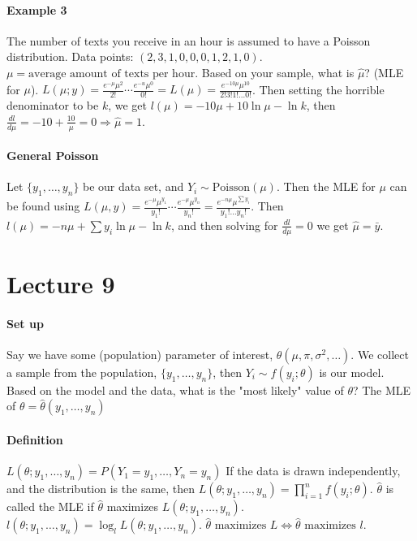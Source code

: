\documentclass[10pt,letter]{article}
\theoremstyle{plain}
\theoremstyle{definition}
\begin{document}
\paragraph{Example 3}
The number of texts you receive in an hour is assumed to have a Poisson distribution. Data points: $(2,3,1,0,0,0,1,2,1,0)$. $\mu=\text{average amount of texts per hour}$. Based on your sample, what is $\hat{\mu}$? (MLE for $\mu$). $L(\mu;y)=\frac{e^{-\mu}\mu^2}{2!}\cdots\frac{e^{-u}\mu^0}{0!}=L(\mu)=\frac{e^{-10\mu}\mu^{10}}{2!3!1!\ldots0!}$. Then setting the horrible denominator to be $k$, we get $l(\mu)=-10\mu+10\ln\mu-\ln k$, then $\frac{dl}{d\mu}=-10+\frac{10}{\mu}=0\Rightarrow \hat{\mu}=1$. 
\paragraph{General Poisson}
Let $\{y_1,\ldots,y_n\}$ be our data set, and $Y_i\sim \text{Poisson}(\mu)$. Then the MLE for $\mu$ can be found using $L(\mu,y)=\frac{e^{-\mu}\mu^{y_1}}{y_1!}\cdots\frac{e^{-\mu}\mu^{y_n}}{y_n!}=\frac{e^{-n\mu}\mu^{\sum y_i}}{y_1!\ldots y_n!}$. Then $l(\mu)=-n\mu+\sum y_i\ln\mu-\ln k$, and then solving for $\frac{dl}{d\mu}=0$ we get $\hat{\mu}=\bar{y}$. 

\section*{Lecture 9}
\paragraph{Set up}
Say we have some (population) parameter of interest, $\theta(\mu,\pi,\sigma^2,\ldots)$. We collect a sample from the population, $\{y_1,\ldots,y_n\}$, then $Y_i\sim f(y_i;\theta)$ is our model. Based on the model and the data, what is the "most likely" value of $\theta$? The MLE of $\theta=\hat{\theta}(y_1,\ldots,y_n)$\\ 
\paragraph{Definition}
$L(\theta;y_1,\ldots,y_n)=P(Y_1=y_1,\ldots,Y_n=y_n)$ If the data is drawn independently, and the distribution is the same, then $L(\theta;y_1,\ldots,y_n)=\prod_{i=1}^nf(y_i;\theta)$. $\hat{\theta}$ is called the MLE if $\hat{\theta}$ maximizes $L(\theta;y_1,\ldots,y_n)$. $l(\theta;y_1,\ldots,y_n)=\log_lL(\theta;y_1,\ldots,y_n)$. $\hat{\theta}\text{ maximizes }L\Leftrightarrow \hat{\theta}\text{ maximizes }l$. 
\end{document}
